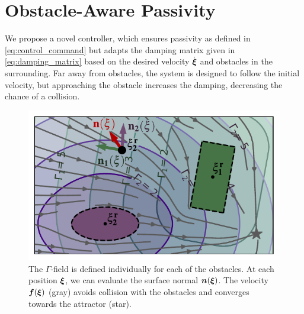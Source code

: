 \section{Obstacle-Aware Passivity} \label{sec:obstacle_aware_passivity}
We propose a novel controller, which ensures passivity as defined in \eqref{eq:control_command} but adapts the damping matrix given in \eqref{eq:damping_matrix} based on the desired velocity $\dot{\boldsymbol{\xi}}$ and obstacles in the surrounding. 
Far away from obstacles, the system is designed to follow the initial velocity, but approaching the obstacle increases the damping, decreasing the chance of a collision.

\ifthesis
\begin{figure}
\centerline{\includegraphics[width=0.7\columnwidth]{figures/normal_and_gamma_field_visualization_annotated.pdf}}
\caption{
The $\Gamma$-field is defined individually for each of the obstacles. At each position $\boldsymbol{\xi}$, we can evaluate the surface normal $\boldsymbol{n}(\boldsymbol{\xi})$. 
The velocity $\boldsymbol{f}(\boldsymbol{\xi})$ (gray) avoids collision with the obstacles and converges towards the attractor (star).}
\label{fig:resultant_normal}
\end{figure}
\fi


